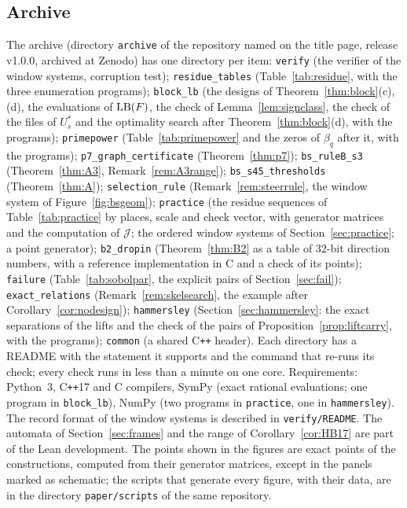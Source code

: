 \subsection{Archive}\label{app:archive}
The archive (directory \texttt{archive} of the repository named on the title page, release v1.0.0, archived at Zenodo) has one directory per item:
%
%
\texttt{verify} (the verifier of the window systems, corruption test);
\texttt{residue\_tables} (Table~\ref{tab:residue}, with the three enumeration programs);
\texttt{block\_lb} (the designs of Theorem~\ref{thm:block}(c),(d), the evaluations of $\mathrm{LB}(F)$, the check of Lemma~\ref{lem:signclass}, the check of the files of $U^*_s$ and the optimality search after Theorem~\ref{thm:block}(d), with the programs);
\texttt{primepower} (Table~\ref{tab:primepower} and the zeros of $\beta_q$ after it, with the programs);
\texttt{p7\_\allowbreak graph\_\allowbreak certificate} (Theorem~\ref{thm:p7});
\texttt{bs\_ruleB\_s3} (Theorem~\ref{thm:A3}, Remark~\ref{rem:A3range});
\texttt{bs\_\allowbreak s45\_\allowbreak thresholds} (Theorem~\ref{thm:A});
\texttt{selection\_rule} (Remark~\ref{rem:steerrule}, the window system of Figure~\ref{fig:bsgeom});
\texttt{practice} (the residue sequences of Table~\ref{tab:practice} by places, scale and check vector, with generator matrices and the computation of $\mathcal J$; the ordered window systems of Section~\ref{sec:practice}; a point generator);
\texttt{b2\_dropin} (Theorem~\ref{thm:B2} as a table of $32$-bit direction numbers, with a reference implementation in C and a check of its points);
\texttt{failure} (Table~\ref{tab:sobolpar}, the explicit pairs of Section~\ref{sec:fail});
\texttt{exact\_relations} (Remark~\ref{rem:skelsearch}, the example after Corollary~\ref{cor:nodesign});
\texttt{hammersley} (Section~\ref{sec:hammersley}: the exact separations of the lifts and the check of the pairs of Proposition~\ref{prop:liftcarry}, with the programs);
\texttt{common} (a shared C\texttt{++} header).
Each directory has a README with the statement it supports and the command that re-runs its check; every check runs in less than a minute on one core. Requirements: Python~3, C\texttt{++}17 and C compilers, SymPy (exact rational evaluations; one program in \texttt{block\_lb}), NumPy (two programs in \texttt{practice}, one in \texttt{hammersley}). The record format of the window systems is described in \texttt{verify/README}. The automata of Section~\ref{sec:frames} and the range of Corollary~\ref{cor:HB17} are part of the Lean development. The points shown in the figures are exact points of the constructions, computed from their generator matrices, except in the panels marked as schematic; the scripts that generate every figure, with their data, are in the directory \texttt{paper/scripts} of the same repository.

